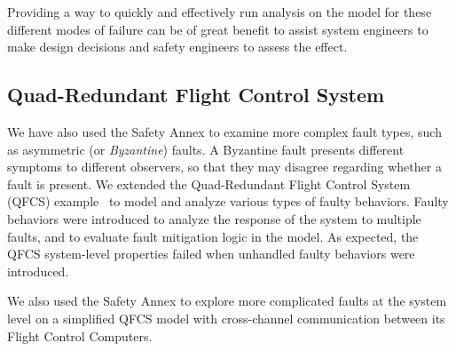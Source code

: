 Providing a way to quickly and effectively run analysis on the model 
for these different modes of failure can be of great benefit to assist system engineers to make design decisions and safety engineers to assess the effect.


\subsection{Quad-Redundant Flight Control System}
We have also used the Safety Annex to examine more complex fault types, such as asymmetric (or {\em Byzantine}) faults.  A Byzantine fault presents different symptoms to different observers, so that they may disagree regarding whether a fault is present.
We extended the Quad-Redundant Flight Control System (QFCS) example~\cite{QFCS15:backes} to model and analyze various types of faulty behaviors. Faulty behaviors were introduced to analyze the response of the system to multiple faults, and to evaluate fault mitigation logic in the model. As expected, the QFCS system-level properties failed when unhandled faulty behaviors were introduced.

We also used the Safety Annex to explore more complicated faults at the system level on a simplified QFCS model with cross-channel communication between its Flight Control Computers.

